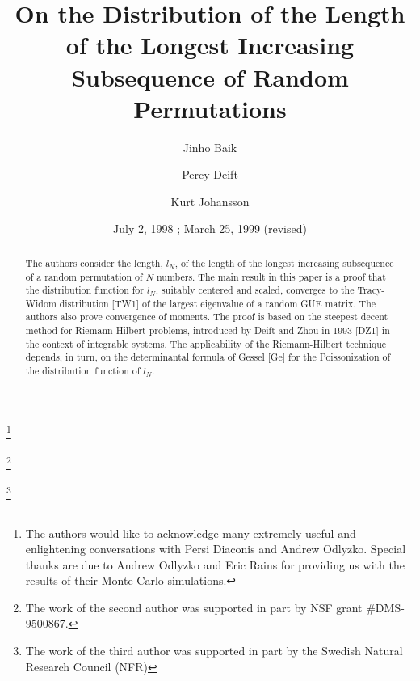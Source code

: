 \documentclass{amsart}
\theoremstyle{definition}
\theoremstyle{remark}
\numberwithin{equation}{section}
\begin{document}
\title[Longest Increasing Subsequence]
{On the Distribution of the Length of the Longest Increasing Subsequence 
of Random Permutations} 

\author{Jinho Baik}
\address{Courant Institute of Mathematical Sciences, New York}

\curraddr{}

\thanks{The authors would like to acknowledge
many extremely useful and enlightening conversations with Persi Diaconis and
Andrew Odlyzko.  Special thanks are due 
to Andrew Odlyzko and Eric Rains for providing us with
the results of their Monte Carlo simulations. }


\author{Percy Deift}
\address{Courant Institute of Mathematical Sciences, New York}
\thanks{The work of the second author was supported in part by NSF
grant \#DMS-9500867.}

\author{Kurt Johansson}
\address{Royal Institute of Technology, Sweden}
\thanks{The work of the third
author was supported in part by the Swedish Natural Research Council
(NFR)}




\date{July 2, 1998 ; March 25, 1999 (revised)}

\dedicatory{}


\begin{abstract}
  The authors consider the length, $l_N$, of the length of the longest 
increasing subsequence of a random permutation of $N$ numbers. 
The main result in this paper is a proof that the distribution function 
for $l_N$, suitably centered and scaled, converges to the 
Tracy-Widom distribution [TW1] of the largest eigenvalue of a random 
GUE matrix. 
The authors also prove convergence of moments.
The proof is based on the steepest decent method for Riemann-Hilbert 
problems, introduced by Deift and Zhou in 1993 [DZ1] in the context 
of integrable systems.
The applicability of the Riemann-Hilbert technique depends, in turn, 
on the determinantal formula of Gessel [Ge] for the Poissonization 
of the distribution function of $l_N$.
\end{abstract}
\end{document}
